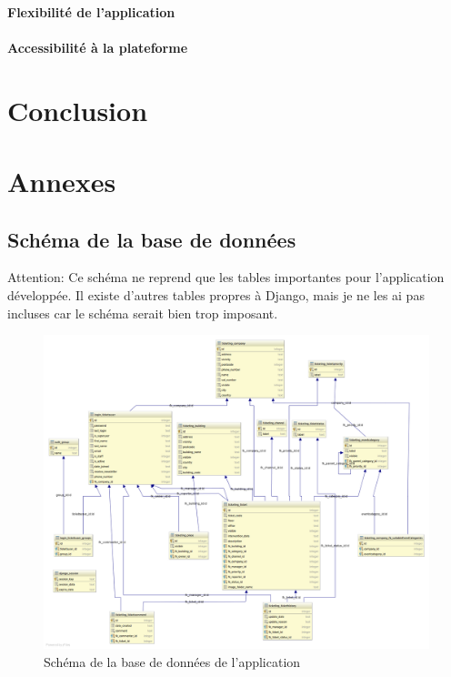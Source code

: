 \documentclass[12pt,table,a4paper]{report}
\begin{document}
\subsubsection{Flexibilité de l'application}
\subsubsection{Accessibilité à la plateforme}

\chapter{Conclusion}

\chapter{Annexes}

\section{Schéma de la base de données}
Attention: Ce schéma ne reprend que les tables importantes pour l'application développée. Il existe d'autres tables propres à Django, mais je ne les ai pas incluses car le schéma serait bien trop imposant.

\begin{figure}
\centering
\includegraphics[width=\textwidth]{images/schemas/ticket-database-schema.png}
\caption{Schéma de la base de données de l'application}
\label{fig:schema-database}
\end{figure}
\end{document}
